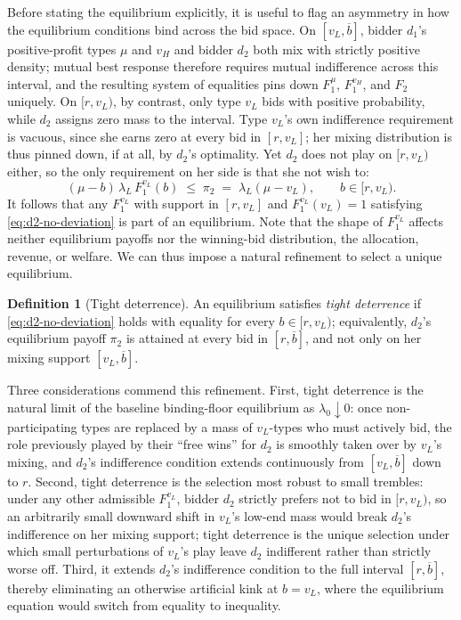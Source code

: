 \documentclass[11pt]{article}
\theoremstyle{plain}
\theoremstyle{definition}
\newtheorem{defn}[thm]{Definition}
\theoremstyle{plain}
\theoremstyle{plain}
\theoremstyle{plain}
\theoremstyle{plain}
\numberwithin{equation}{section}
\begin{document}
\noindent Before stating the equilibrium explicitly, it is useful to flag an asymmetry in how the equilibrium conditions bind across the bid space. On $[v_L, \overline{b}]$, bidder $d_1$'s positive-profit types $\mu$ and $v_H$ and bidder $d_2$ both mix with strictly positive density; mutual best response therefore requires mutual indifference across this interval, and the resulting system of equalities pins down $F_1^{\mu}$, $F_1^{v_H}$, and $F_2$ uniquely. On $[r, v_L)$, by contrast, only type $v_L$ bids with positive probability, while $d_2$ assigns zero mass to the interval. Type $v_L$'s own indifference requirement is vacuous, since she earns zero at every bid in $[r, v_L]$; her mixing distribution is thus pinned down, if at all, by $d_2$'s optimality. Yet $d_2$ does not play on $[r, v_L)$ either, so the only requirement on her side is that she not wish to:
\begin{equation}\label{eq:d2-no-deviation}
(\mu - b)\,\lambda_L\,F_1^{v_L}(b) \;\le\; \pi_2 \;=\; \lambda_L(\mu - v_L), \qquad b\in[r,v_L).
\end{equation}
It follows that any $F_1^{v_L}$ with support in $[r, v_L]$ and $F_1^{v_L}(v_L) = 1$ satisfying \eqref{eq:d2-no-deviation} is part of an equilibrium. Note that the shape of $F_1^{v_L}$ affects neither equilibrium payoffs nor the winning-bid distribution, the allocation, revenue, or welfare. We can thus impose a natural refinement to select a unique equilibrium.

\begin{defn}[Tight deterrence]\label{def:tight-deterrence}
An equilibrium satisfies \textit{tight deterrence} if \eqref{eq:d2-no-deviation} holds with equality for every $b \in [r, v_L)$; equivalently, $d_2$'s equilibrium payoff $\pi_2$ is attained at every bid in $[r, \overline{b}]$, and not only on her mixing support $[v_L, \overline{b}]$.
\end{defn}

\vspace{0.2cm}

\noindent Three considerations commend this refinement. First, tight deterrence is the natural limit of the baseline binding-floor equilibrium as $\lambda_0 \downarrow 0$: once non-participating types are replaced by a mass of $v_L$-types who must actively bid, the role previously played by their ``free wins'' for $d_2$ is smoothly taken over by $v_L$'s mixing, and $d_2$'s indifference condition extends continuously from $[v_L, \overline{b}]$ down to $r$. Second, tight deterrence is the selection most robust to small trembles: under any other admissible $F_1^{v_L}$, bidder $d_2$ strictly prefers not to bid in $[r, v_L)$, so an arbitrarily small downward shift in $v_L$'s low-end mass would break $d_2$'s indifference on her mixing support; tight deterrence is the unique selection under which small perturbations of $v_L$'s play leave $d_2$ indifferent rather than strictly worse off. Third, it extends $d_2$'s indifference condition to the full interval $[r, \overline{b}]$, thereby eliminating an otherwise artificial kink at $b = v_L$, where the equilibrium equation would switch from equality to inequality.
\end{document}
